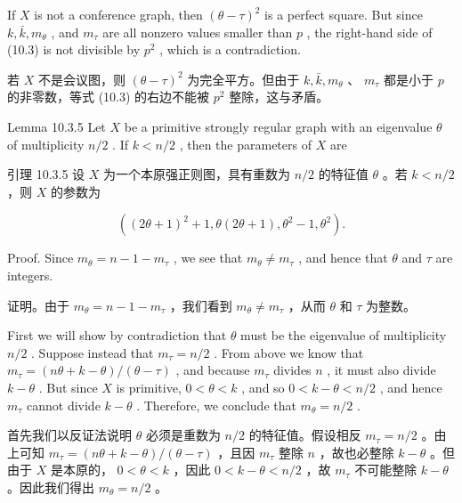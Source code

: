 \documentclass[10pt]{article}
\begin{document}
If \(X\) is not a conference graph, then \({\left( \theta  - \tau \right) }^{2}\) is a perfect square. But since \(k,\bar{k},{m}_{\theta }\) , and \({m}_{\tau }\) are all nonzero values smaller than \(p\) , the right-hand side of (10.3) is not divisible by \({p}^{2}\) , which is a contradiction.

\begin{tcolorbox}\relax
若 \(X\) 不是会议图，则 \({\left( \theta  - \tau \right) }^{2}\) 为完全平方。但由于 \(k,\bar{k},{m}_{\theta }\) 、 \({m}_{\tau }\) 都是小于 \(p\) 的非零数，等式 (10.3) 的右边不能被 \({p}^{2}\) 整除，这与矛盾。
\end{tcolorbox}

Lemma 10.3.5 Let \(X\) be a primitive strongly regular graph with an eigenvalue \(\theta\) of multiplicity \(n/2\) . If \(k < n/2\) , then the parameters of \(X\) are

\begin{tcolorbox}\relax
引理 10.3.5 设 \(X\) 为一个本原强正则图，具有重数为 \(n/2\) 的特征值 \(\theta\) 。若 \(k < n/2\) ，则 \(X\) 的参数为
\end{tcolorbox}

\[
\left( {{\left( 2\theta  + 1\right) }^{2} + 1,\theta \left( {{2\theta } + 1}\right) ,{\theta }^{2} - 1,{\theta }^{2}}\right) .
\]

Proof. Since \({m}_{\theta } = n - 1 - {m}_{\tau }\) , we see that \({m}_{\theta } \neq  {m}_{\tau }\) , and hence that \(\theta\) and \(\tau\) are integers.

\begin{tcolorbox}\relax
证明。由于 \({m}_{\theta } = n - 1 - {m}_{\tau }\) ，我们看到 \({m}_{\theta } \neq  {m}_{\tau }\) ，从而 \(\theta\) 和 \(\tau\) 为整数。
\end{tcolorbox}

First we will show by contradiction that \(\theta\) must be the eigenvalue of multiplicity \(n/2\) . Suppose instead that \({m}_{\tau } = n/2\) . From above we know that \({m}_{\tau } = \left( {{n\theta } + k - \theta }\right) /\left( {\theta  - \tau }\right)\) , and because \({m}_{\tau }\) divides \(n\) , it must also divide \(k - \theta\) . But since \(X\) is primitive, \(0 < \theta  < k\) , and so \(0 < k - \theta  < n/2\) , and hence \({m}_{\tau }\) cannot divide \(k - \theta\) . Therefore, we conclude that \({m}_{\theta } = n/2\) .

\begin{tcolorbox}\relax
首先我们以反证法说明 \(\theta\) 必须是重数为 \(n/2\) 的特征值。假设相反 \({m}_{\tau } = n/2\) 。由上可知 \({m}_{\tau } = \left( {{n\theta } + k - \theta }\right) /\left( {\theta  - \tau }\right)\) ，且因 \({m}_{\tau }\) 整除 \(n\) ，故也必整除 \(k - \theta\) 。但由于 \(X\) 是本原的， \(0 < \theta  < k\) ，因此 \(0 < k - \theta  < n/2\) ，故 \({m}_{\tau }\) 不可能整除 \(k - \theta\) 。因此我们得出 \({m}_{\theta } = n/2\) 。
\end{tcolorbox}
\end{document}
